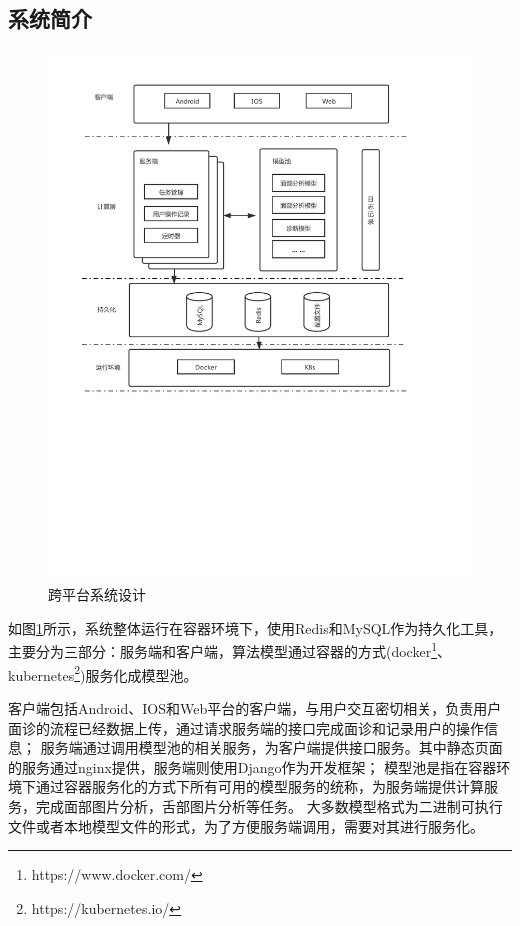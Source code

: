 \subsection{系统简介}
\begin{figure}[ht]
    \centering
    \includegraphics[width=15cm]{images/system2.pdf}
    \caption{跨平台系统设计}
    \label{fig:system}
\end{figure}

如图\ref{fig:system}所示，系统整体运行在容器环境下，使用Redis和MySQL作为持久化工具，主要分为三部分：服务端和客户端，算法模型通过容器的方式(docker\footnote{https://www.docker.com/}、kubernetes\footnote{https://kubernetes.io/})服务化成模型池。

客户端包括Android、IOS和Web平台的客户端，与用户交互密切相关，负责用户面诊的流程已经数据上传，通过请求服务端的接口完成面诊和记录用户的操作信息；
服务端通过调用模型池的相关服务，为客户端提供接口服务。其中静态页面的服务通过nginx提供，服务端则使用Django作为开发框架；
模型池是指在容器环境下通过容器服务化的方式下所有可用的模型服务的统称，为服务端提供计算服务，完成面部图片分析，舌部图片分析等任务。
大多数模型格式为二进制可执行文件或者本地模型文件的形式，为了方便服务端调用，需要对其进行服务化。

